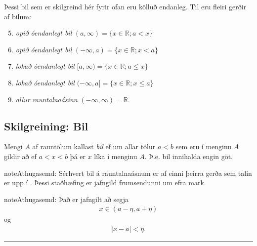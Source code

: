 \documentclass[b5paper,11pt,icelandic]{sphinxmanual}
\begin{document}
Þessi bil sem er skilgreind hér fyrir ofan eru kölluð endanleg. Til eru
fleiri gerðir af bilum:
\begin{enumerate}
\setcounter{enumi}{4}
\item {} 
\emph{opið óendanlegt bil} \((a,\infty)=\{x\in \mathbb{R}; a<x\}\)

\item {} 
\emph{opið óendanlegt bil} \((-\infty, a)=\{x\in \mathbb{R}; x<a\}\)

\item {} 
\emph{lokað óendanlegt bil} \([a,\infty)=\{x\in \mathbb{R}; a\leq x\}\)

\item {} 
\emph{lokað óendanlegt bil} \((-\infty, a]=\{x\in \mathbb{R}; x\leq a\}\)

\item {} 
\emph{allur rauntalnaásinn} \((-\infty, \infty)= \mathbb{R}\).

\end{enumerate}


\subsection{Skilgreining: Bil}
\label{kafli01:id1}
Mengi \(A\) af rauntölum kallast \textit{bil} ef um allar
tölur \(a<b\) sem eru í menginu \(A\) gildir að ef \(a<x<b\)
þá er \(x\) líka í menginu \(A\). Þ.e. bil innihalda engin göt.

\begin{notice}{note}{Athugasemd:}
Sérhvert bil á rauntalnaásnum er af einni þeirra gerða sem talin er
upp í {\hyperref[kafli01:skilgreining\string-1\string-3\string-1]{}}. Þessi staðhæfing er jafngild frumsendunni um
efra mark.
\end{notice}

\begin{notice}{note}{Athugasemd:}
Það er jafngilt að segja
\begin{equation*}
\begin{split}x \in (a-\eta,a+\eta)\end{split}
\end{equation*}
og
\begin{equation*}
\begin{split}|x-a| < \eta.\end{split}
\end{equation*}\end{notice}


\bigskip\hrule{}\bigskip
\end{document}
